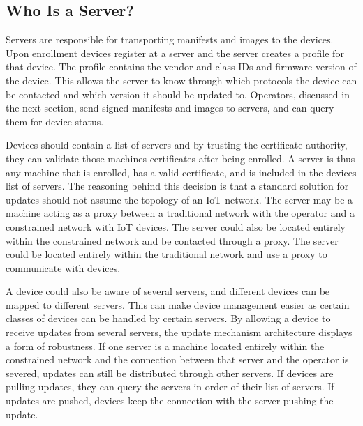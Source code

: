 \documentclass[0-thesis.tex]{subfiles}
\begin{document}
\subsection{Who Is a Server?}
\label{ssec:who-is-a-server}
Servers are responsible for transporting manifests and images to the devices. Upon
enrollment devices register at a server and the server creates a profile for that device.
The profile contains the vendor and class IDs and firmware version of the device. This
allows the server to know through which protocols the device can be contacted and which
version it should be updated to. Operators, discussed in the next section, send signed
manifests and images to servers, and can query them for device status.

Devices should contain a list of servers and by trusting the certificate authority, they
can validate those machines certificates after being enrolled. A server is thus any
machine that is enrolled, has a valid certificate, and is included in the devices list of
servers. The reasoning behind this decision is that a standard solution for updates should
not assume the topology of an IoT network. The server may be a machine acting as a proxy
between a traditional network with the operator and a constrained network with IoT
devices. The server could also be located entirely within the constrained network and be
contacted through a proxy. The server could be located entirely within the traditional
network and use a proxy to communicate with devices. 

A device could also be aware of several servers, and different devices can be mapped to
different servers. This can make device management easier as certain classes of devices
can be handled by certain servers. By allowing a device to receive updates from several
servers, the update mechanism architecture displays a form of robustness. If one server is
a machine located entirely within the constrained network and the connection between that
server and the operator is severed, updates can still be distributed through other
servers. If devices are pulling updates, they can query the servers in order of their list
of servers. If updates are pushed, devices keep the connection with the server pushing the
update.
\end{document}

